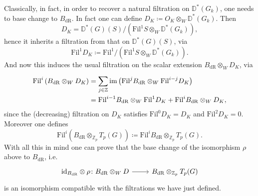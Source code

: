 \begin{rem}[]
	Classically, in fact, in order to recover a natural filtration on $\mathbb{D}^*(G_k)$,
	one needs to base change to $B_{\mathrm{dR}}$.
	In fact one can define $D_{K} \coloneqq O_K \otimes_W \mathbb{D}^*(G_k)$.
	Then 
	\begin{equation*}
		D_K = \mathbb{D}^*(G)(S)/\left( \mathrm{Fil}^1S \otimes_W \mathbb{D}^*(G_k)\right)
	,\end{equation*}
	hence it inherits a filtration from that on $\mathbb{D}^*(G)(S)$, via
	\begin{equation*}
	\mathrm{Fil}^1 D_K \coloneqq 
	\mathrm{Fil}^1 / \left( \mathrm{Fil}^1S \otimes_W \mathbb{D}^*(G_k) \right)
	.\end{equation*}
	And now this induces the usual filtration on the scalar extension
	$B_{\mathrm{dR}} \otimes_{W} D_K$, via 
	\begin{align*}
		\mathrm{Fil}^i \left( B_{\mathrm{dR}} \otimes_{W} D_K \right) &=
		\sum_{j \in \mathbb{Z} }^{  } \operatorname{im} \left( 
		\mathrm{Fil}^j B_{\mathrm{dR}} \otimes_{W} \mathrm{Fil}^{i-j} D_K \right) \\
		&=
		\mathrm{Fil}^{i-1} B_{\mathrm{dR}} \otimes_{W} \mathrm{Fil}^1 D_K +
		\mathrm{Fil}^{i} B_{\mathrm{dR}} \otimes_{W} D_K
	,\end{align*}
	since the (decreasing) filtration on $D_K$ satisfies
	$\mathrm{Fil}^0 D_K = D_K$ and $\mathrm{Fil}^2 D_K = 0$.
	Moreover one defines
	\begin{equation*}
		\mathrm{Fil}^i \left( B_{\mathrm{dR}} \otimes_{\mathbb{Z}_{p}} T_p(G) \right) \coloneqq
		\mathrm{Fil}^i B_{\mathrm{dR}} \otimes_{\mathbb{Z}_{p}} T_p(G)
	.\end{equation*}
	With all this in mind one can prove that the base change of the
	isomorphism $\rho$ above to $B_{\mathrm{dR}}$, i.e.
	\begin{equation*}
	\begin{tikzcd}[row sep = 0ex
		,/tikz/column 1/.append style={anchor=base east}
		,/tikz/column 2/.append style={anchor=base west}]
		\mathrm{id}_{ B_{\mathrm{dR}} } \otimes \rho\colon 
		B_{\mathrm{dR}} \otimes_W D \arrow[r, "", rightarrow] &
		B_{\mathrm{dR}} \otimes_{\mathbb{Z}_{p}} T_p(G)
	\end{tikzcd}
	\end{equation*} 
	is an isomorphism compatible with the filtrations we have just defined.
\end{rem}
